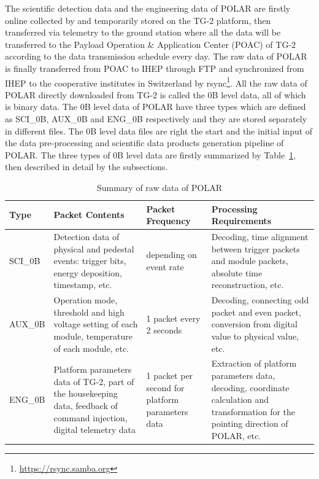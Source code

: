 \documentclass{raa}
\begin{document}
The scientific detection data and the engineering data of POLAR are firstly online collected by and temporarily stored on the TG-2 platform, then transferred via telemetry to the ground station where all the data will be transferred to the Payload Operation \& Application Center (POAC) of TG-2 according to the data transmission schedule every day. The raw data of POLAR is finally transferred from POAC to IHEP through FTP and synchronized from IHEP to the cooperative institutes in Switzerland by rsync\footnote{\url{https://rsync.samba.org}}. All the raw data of POLAR directly downloaded from TG-2 is called the 0B level data, all of which is binary data. The 0B level data of POLAR have three types which are defined as SCI\_0B, AUX\_0B and ENG\_0B respectively and they are stored separately in different files. The 0B level data files are right the start and the initial input of the data pre-processing and scientific data products generation pipeline of POLAR. The three types of 0B level data are firstly summarized by Table~\ref{tab:raw_data}, then described in detail by the subsections. 

\begin{table}[!ht]
\centering
\caption{Summary of raw data of POLAR}\label{tab:raw_data}
\begin{tabular}{|p{1.2cm}|p{4.5cm}|p{2.5cm}|p{4.5cm}|}\hline
Type & Packet Contents & Packet Frequency & Processing Requirements \\\hline
SCI\_0B & Detection data of physical and pedestal events: trigger bits, energy deposition, timestamp, etc. & depending on event rate & Decoding, time alignment between trigger packets and module packets, absolute time reconstruction, etc.  \\\hline
AUX\_0B & Operation mode, threshold and high voltage setting of each module, temperature of each module, etc. & 1 packet every 2 seconds & Decoding, connecting odd packet and even packet, conversion from digital value to physical value, etc. \\\hline
ENG\_0B & Platform parameters data of TG-2, part of the housekeeping data, feedback of command injection, digital telemetry data & 1 packet per second for platform parameters data & Extraction of platform parameters data, decoding, coordinate calculation and transformation for the pointing direction of POLAR, etc.\\\hline
\end{tabular}
\end{table}
\end{document}
